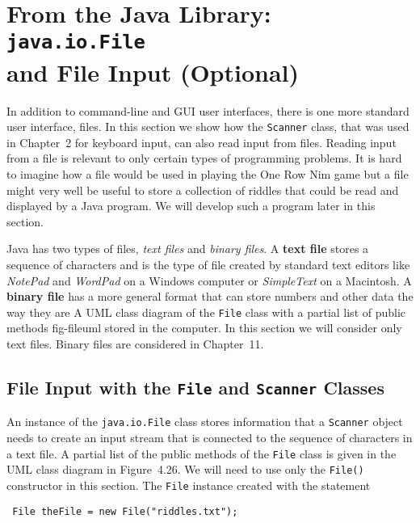 \section{From the Java Library: {\tt java.io.File} \\ and File Input (Optional)}
\label{fromthe-java-libraryand-file-input-optional}

\label{pg-sec-fileclass}

In addition to command-line and GUI user interfaces, there is one more
standard user interface, files. In this section we show how the {\tt Scanner} 
class, that was used in Chapter~2 for keyboard input, can also 
read input from files.  Reading input from
a file is relevant to only certain types of programming problems.  
It is hard to imagine how a file would be used in playing the One Row Nim 
game but a file might very well be useful to store a collection of riddles
that could be read and displayed by a Java program.  We will develop such a 
program later in this section.

Java has two types of files, {\it text files} and {\it binary files}.  
A {\bf text file} stores a sequence of characters and is the type of
file created by standard text editors like {\it NotePad} and {\it WordPad}
on a Windows computer or {\it SimpleText} on a Macintosh. A {\bf binary file}
has a more general format that can store numbers and other data the way they are
 {A UML class diagram of the {\tt File}
 class with a partial list of public methods }
{fig-fileuml}
stored in the computer.  In this section we will consider only text files. Binary
files are considered in Chapter~11.


\subsection{File Input with the {\tt File} and {\tt Scanner} Classes} 

An instance of the {\tt java.io.File} class stores information that
a {\tt Scanner} object needs to create an input stream that is connected
to the sequence of characters in a text file. A partial list of the
public methods of the {\tt File} class is given in the UML class diagram 
in Figure~4.26.  We will need to use only the {\tt File()}
constructor in this section.  The {\tt File} instance created with the 
statement

\begin{jjjlisting}
\begin{lstlisting}
 File theFile = new File("riddles.txt");
\end{lstlisting}
\end{jjjlisting}

